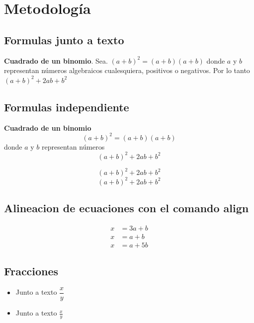 \chapter{Metodología }
\section{Formulas junto a texto}
\textbf{Cuadrado de un binomio}. Sea. $(a+b)^{2} = (a+b)(a+b)$ donde $a$ y $b$ representan números algebraicos cualesquiera, positivos o negativos. Por lo tanto $ (a+b)^{2} + 2ab + b^{2}$

\section{Formulas independiente}
\textbf{Cuadrado de un binomio}
\[
  (a+b)^{2} = (a+b)(a+b)
\]
 donde $a$ y $b$ representan números
\[
 (a+b)^{2} + 2ab + b^{2}
 \]
 
\begin{equation}
 (a+b)^{2} + 2ab + b^{2}
\end{equation}
\begin{equation}
 (a+b)^{2} + 2ab + b^{2}
\end{equation}

\section{Alineacion de ecuaciones con el comando align}

\begin{align}
 x &= 3a + b\\
 x &= a + b\\
 x &= a + 5b
\end{align}

\newpage

\section{Fracciones}
\begin{itemize}
\item Junto a texto $\dfrac{x}{y}$
\item Junto a texto $\frac{x}{y}$
\end{itemize}

